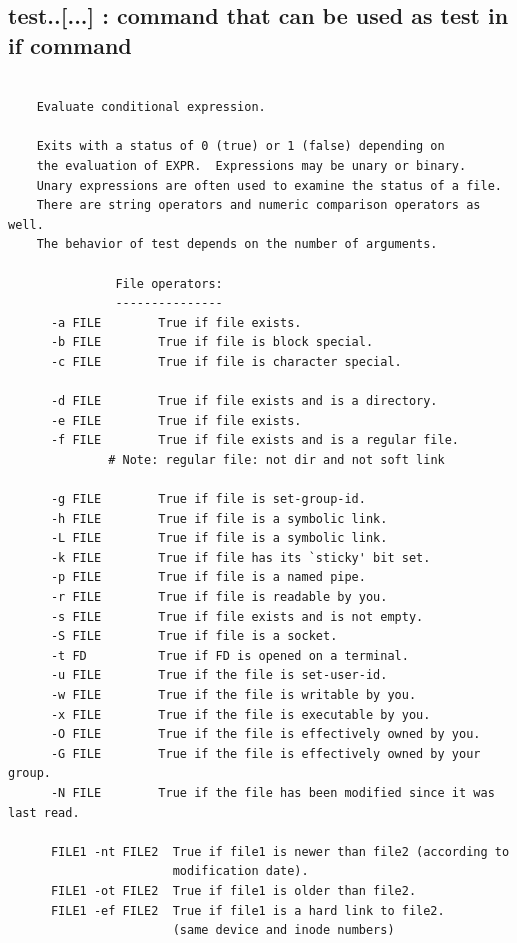 \documentclass[a4paper,12pt]{article}
\begin{document}
\subsection{test..[...]   : command that can be used as test in if command}
\begin{verbatim}
      
    Evaluate conditional expression.
    
    Exits with a status of 0 (true) or 1 (false) depending on
    the evaluation of EXPR.  Expressions may be unary or binary.  
    Unary expressions are often used to examine the status of a file.  
    There are string operators and numeric comparison operators as well.
    The behavior of test depends on the number of arguments.  
    
               File operators:
               ---------------
      -a FILE        True if file exists.
      -b FILE        True if file is block special.
      -c FILE        True if file is character special.
      
      -d FILE        True if file exists and is a directory.
      -e FILE        True if file exists.
      -f FILE        True if file exists and is a regular file.
              # Note: regular file: not dir and not soft link
      
      -g FILE        True if file is set-group-id.
      -h FILE        True if file is a symbolic link.
      -L FILE        True if file is a symbolic link.
      -k FILE        True if file has its `sticky' bit set.
      -p FILE        True if file is a named pipe.
      -r FILE        True if file is readable by you.
      -s FILE        True if file exists and is not empty.
      -S FILE        True if file is a socket.
      -t FD          True if FD is opened on a terminal.
      -u FILE        True if the file is set-user-id.
      -w FILE        True if the file is writable by you.
      -x FILE        True if the file is executable by you.
      -O FILE        True if the file is effectively owned by you.
      -G FILE        True if the file is effectively owned by your group.
      -N FILE        True if the file has been modified since it was last read.
      
      FILE1 -nt FILE2  True if file1 is newer than file2 (according to              
                       modification date).
      FILE1 -ot FILE2  True if file1 is older than file2.
      FILE1 -ef FILE2  True if file1 is a hard link to file2.
                       (same device and inode numbers)
      

\end{verbatim}
\end{document}
